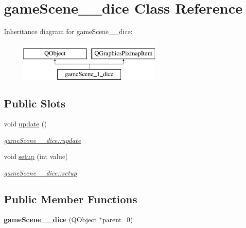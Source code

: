 \hypertarget{classgameScene__1__dice}{\section{game\-Scene\-\_\-\_\-dice Class Reference}
\label{classgameScene__1__dice}
}
Inheritance diagram for game\-Scene\-\_\-\_\-dice\-:\begin{figure}[H]
\begin{center}
\leavevmode
\includegraphics[height=2.000000cm]{classgameScene__1__dice}
\end{center}
\end{figure}
\subsection*{Public Slots}
\begin{DoxyCompactItemize}
\item 
void \hyperlink{classgameScene__1__dice_aa70064b1cab5ac14ca1a7ff757a1e73b}{update} ()
\begin{DoxyCompactList}\small\item\em \hyperlink{classgameScene__1__dice_aa70064b1cab5ac14ca1a7ff757a1e73b}{game\-Scene\-\_\-\_\-dice\-::update} \end{DoxyCompactList}\item 
void \hyperlink{classgameScene__1__dice_af16a75f80f77a5ef743eb0e458ad40fd}{setup} (int value)
\begin{DoxyCompactList}\small\item\em \hyperlink{classgameScene__1__dice_af16a75f80f77a5ef743eb0e458ad40fd}{game\-Scene\-\_\-\_\-dice\-::setup} \end{DoxyCompactList}\end{DoxyCompactItemize}
\subsection*{Public Member Functions}
\begin{DoxyCompactItemize}
\item 
\hypertarget{classgameScene__1__dice_a0344f480bb7de748b55dabe760db0e80}{{\bfseries game\-Scene\-\_\-\_\-dice} (Q\-Object $\ast$parent=0)}\label{classgameScene__1__dice_a0344f480bb7de748b55dabe760db0e80}

\end{DoxyCompactItemize}
